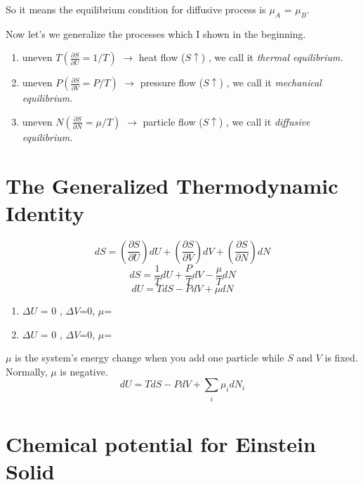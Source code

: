 So it means the equilibrium condition for diffusive process is $\mu_A$ = $\mu_B$.

Now let's we generalize the processes which I shown in the beginning.
\begin{enumerate}
\item uneven $T(\frac {\partial{S}} {\partial{U}} = 1/T)  $ $\rightarrow$ heat     flow ($S\uparrow$) , we call it {\it thermal equilibrium.}
\item uneven $P(\frac {\partial{S}} {\partial{V}} = P/T)  $ $\rightarrow$ pressure flow ($S\uparrow$) , we call it {\it mechanical equilibrium.}
\item uneven $N(\frac {\partial{S}} {\partial{N}} = \mu/T)$ $\rightarrow$ particle flow ($S\uparrow$) , we call it {\it diffusive equilibrium.}
\end{enumerate}

\section{The Generalized Thermodynamic Identity}

\begin{equation} dS = (\frac{\partial S}{\partial U})dU 
                    + (\frac{\partial S}{\partial V})dV  
                    + (\frac{\partial S}{\partial N})dN 
\end{equation}
\begin{equation} dS = \frac{1}{T}dU
                    + \frac{P}{T}dV  
                    - \frac{\mu}{T}dN
\end{equation}
\begin{equation} dU = TdS - PdV  + \mu dN\end{equation}
\begin{enumerate}
\item $\Delta{U}$ = 0 , $\Delta{V}$=0, $\mu$=
\item $\Delta{U}$ = 0 , $\Delta{V}$=0, $\mu$=
\end{enumerate}
$\mu$ is the system's energy change when you add one particle while $S$ and $V$ is fixed. Normally, $\mu$ is negative.\\
\begin{equation} dU = TdS - PdV  + \sum_{\substack{i}} \mu_i dN_i\end{equation}


\section{Chemical potential for Einstein Solid}

